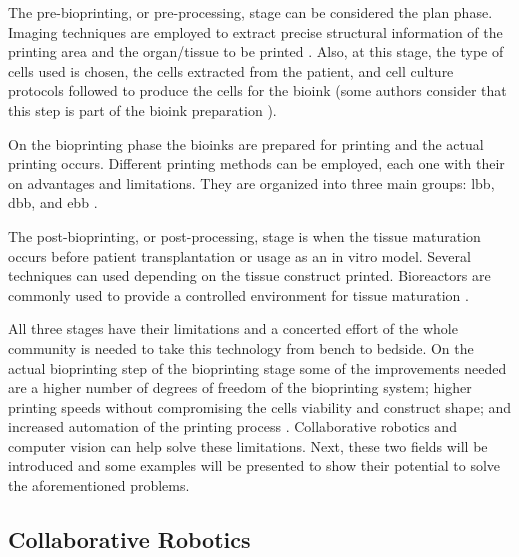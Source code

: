 The pre-bioprinting, or pre-processing, stage can be considered the plan phase. Imaging techniques are employed to extract precise structural information of the printing area and the organ/tissue to be printed \cite{Datta2018_essential_steps_bioprinting, Vijayavenkataraman2018_bioprinting_tissues_organs_regen_med}. Also, at this stage, the type of cells used is chosen, the cells extracted from the patient, and cell culture protocols followed to produce the cells for the bioink (some authors consider that this step is part of the bioink preparation \cite{Vijayavenkataraman2018_bioprinting_tissues_organs_regen_med}). 

On the bioprinting phase the bioinks are prepared for printing and the actual printing occurs. Different printing methods can be employed, each one with their on advantages and limitations. They are organized into three main groups: \gls{lbb}, \gls{dbb}, and \gls{ebb} \cite{Datta2018_essential_steps_bioprinting, Vijayavenkataraman2018_bioprinting_tissues_organs_regen_med}. 

The post-bioprinting, or post-processing, stage is when the tissue maturation occurs before patient transplantation or usage as an in vitro model. Several techniques can used depending on the tissue construct printed. Bioreactors are commonly used to provide a controlled environment for tissue maturation \cite{Datta2018_essential_steps_bioprinting, Vijayavenkataraman2018_bioprinting_tissues_organs_regen_med}.

All three stages have their limitations and a concerted effort of the whole community is needed to take this technology from bench to bedside. On the actual bioprinting step of the bioprinting stage some of the improvements needed are a higher number of degrees of freedom of the bioprinting system; higher printing speeds without compromising the cells viability and construct shape; and increased automation of the printing process \cite{Ozbolat2017_evaluation_bioprinter_tech, Datta2018_essential_steps_bioprinting}. Collaborative robotics and computer vision can help solve these limitations. Next, these two fields will be introduced and some examples will be presented to show their potential to solve the aforementioned problems.


\subsection{Collaborative Robotics} %
\label{subsec:collaborative_robotics}

